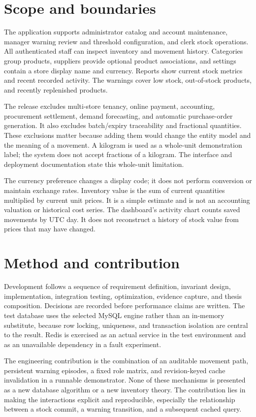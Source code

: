 \section{Scope and boundaries}
The application supports administrator catalog and account maintenance, manager warning review and threshold configuration, and clerk stock operations. All authenticated staff can inspect inventory and movement history. Categories group products, suppliers provide optional product associations, and settings contain a store display name and currency. Reports show current stock metrics and recent recorded activity. The warnings cover low stock, out-of-stock products, and recently replenished products.

The release excludes multi-store tenancy, online payment, accounting, procurement settlement, demand forecasting, and automatic purchase-order generation. It also excludes batch/expiry traceability and fractional quantities. These exclusions matter because adding them would change the entity model and the meaning of a movement. A kilogram is used as a whole-unit demonstration label; the system does not accept fractions of a kilogram. The interface and deployment documentation state this whole-unit limitation.

The currency preference changes a display code; it does not perform conversion or maintain exchange rates. Inventory value is the sum of current quantities multiplied by current unit prices. It is a simple estimate and is not an accounting valuation or historical cost series. The dashboard's activity chart counts saved movements by UTC day. It does not reconstruct a history of stock value from prices that may have changed.

\section{Method and contribution}
Development follows a sequence of requirement definition, invariant design, implementation, integration testing, optimization, evidence capture, and thesis composition. Decisions are recorded before performance claims are written. The test database uses the selected MySQL engine rather than an in-memory substitute, because row locking, uniqueness, and transaction isolation are central to the result. Redis is exercised as an actual service in the test environment and as an unavailable dependency in a fault experiment.

The engineering contribution is the combination of an auditable movement path, persistent warning episodes, a fixed role matrix, and revision-keyed cache invalidation in a runnable demonstrator. None of these mechanisms is presented as a new database algorithm or a new inventory theory. The contribution lies in making the interactions explicit and reproducible, especially the relationship between a stock commit, a warning transition, and a subsequent cached query.

